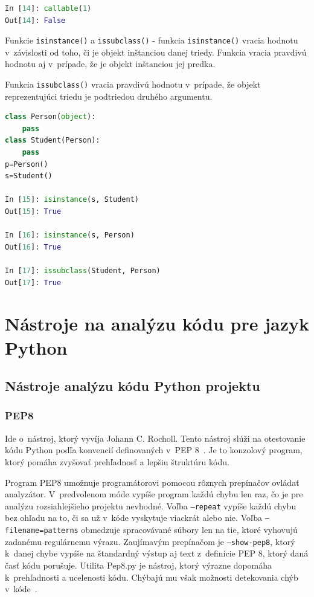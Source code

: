 \documentclass[11pt,oneside,final]{fithesis2}
\begin{document}
\begin{list}{•}{}
\begin{lstlisting}[language=python]
In [14]: callable(1)
Out[14]: False
\end{lstlisting}			


		\item Funkcie \texttt{isinstance()} a \texttt{issubclass()} - 
		funkcia \texttt{isinstance()} vracia hodnotu v~závislosti od toho, či je objekt inštanciou danej triedy. Funkcia vracia pravdivú hodnotu aj v~prípade, že je objekt inštanciou jej predka.
		
		Funkcia \texttt{issubclass()} vracia pravdivú hodnotu v~prípade, že objekt reprezentujúci triedu je podtriedou druhého argumentu.

\begin{lstlisting}[language=python]	
class Person(object):
    pass
class Student(Person):
    pass
p=Person()
s=Student()

In [15]: isinstance(s, Student)
Out[15]: True

In [16]: isinstance(s, Person)
Out[16]: True

In [17]: issubclass(Student, Person)
Out[17]: True
\end{lstlisting}		

\end{list}


\chapter{Nástroje na analýzu kódu pre jazyk Python}
	\section{Nástroje analýzu kódu Python projektu}	


\subsection{PEP8}
	Ide o~nástroj, ktorý vyvíja Johann C. Rocholl. Tento nástroj slúži na otestovanie kódu Python podľa konvencií definovaných v~PEP 8~\cite{pep8}. Je to konzolový program, ktorý pomáha zvyšovať prehľadnosť a lepšiu štruktúru kódu. 
	
	Program PEP8 umožnuje programátorovi pomocou rôznych prepínačov ovládať analyzátor. V~predvolenom móde vypíše program každú chybu len raz, čo je pre analýzu rozsiahlejšieho projektu nevhodné. Voľba \texttt{–repeat} vypíše každú chybu bez ohľadu na to, či sa už v~kóde vyskytuje viackrát alebo nie. Voľba \texttt{–filename=patterns} obmedzuje spracovávané súbory len na tie, ktoré vyhovujú zadanému regulárnemu výrazu. Zaujímavým prepínačom je \texttt{–show-pep8}, ktorý k~danej chybe vypíše na štandardný výstup aj text z~definície PEP 8, ktorý daná časť kódu porušuje.
    Utilita Pep8.py je nástroj, ktorý výrazne dopomáha k~prehľadnosti a ucelenosti kódu. Chýbajú mu však možnosti detekovania chýb v~kóde~\cite{pep8}.
\end{document}
